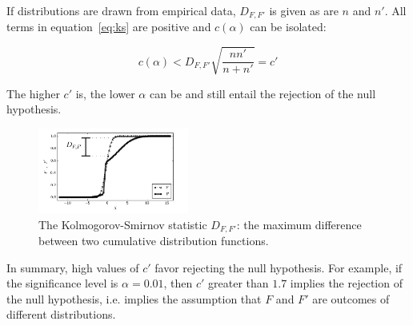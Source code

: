 \documentclass[12pt,fleqn]{article}
\begin{document}
If distributions are drawn from empirical data, $D_{F,F'}$ is given as are $n$ and $n'$.
All terms in equation~\ref{eq:ks} are positive and $c(\alpha)$ can be isolated:

\begin{equation}\label{eq:ks2}
	c(\alpha) < D_{F,F'}\sqrt{\frac{nn'}{n+n'}} = c'
\end{equation}

The higher $c'$ is, the lower $\alpha$ can be and still entail the rejection of the null hypothesis.

\begin{figure}[!htbp] %
\vspace{-2pt}
\begin{center}
	\includegraphics[width=0.44\textwidth]{../figs/Dnn}
	\caption{The Kolmogorov-Smirnov statistic $D_{F,F'}$: the maximum difference between
		two cumulative distribution functions.}
	\label{fig:dnn}
\end{center}
\end{figure}

In summary,
high values of $c'$ favor rejecting the null hypothesis.
For example, if the significance level is $\alpha=0.01$,
then $c'$ greater than $1.7$
implies the rejection of the null hypothesis,
i.e. implies the assumption that $F$ and $F'$
are outcomes of different distributions.
\end{document}
